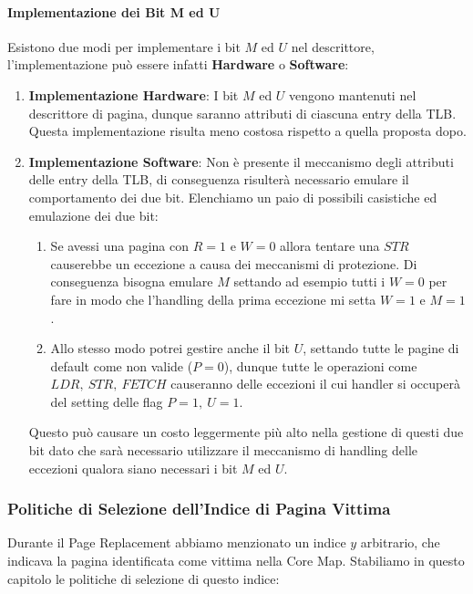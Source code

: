 \documentclass{article}
\begin{document}
\paragraph{Implementazione dei Bit M ed U} Esistono due modi per implementare i bit $M$ ed $U$ nel descrittore, l'implementazione può essere infatti \textbf{Hardware} o \textbf{Software}:

\begin{enumerate}
    \item \textbf{Implementazione Hardware}: I bit $M$ ed $U$ vengono mantenuti nel descrittore di pagina, dunque saranno attributi di ciascuna entry della TLB. Questa implementazione risulta meno costosa rispetto a quella proposta dopo.
    \item \textbf{Implementazione Software}: Non è presente il meccanismo degli attributi delle entry della TLB, di conseguenza risulterà necessario emulare il comportamento dei due bit.
    Elenchiamo un paio di possibili casistiche ed emulazione dei due bit:
    \begin{enumerate}
        \item Se avessi una pagina con $R=1$ e $W=0$ allora tentare una $STR$ causerebbe un eccezione a causa dei meccanismi di protezione. Di conseguenza bisogna emulare $M$ settando ad esempio tutti i $W=0$ per fare in modo che l'handling della prima eccezione mi setta $W=1$ e $M=1$.
        \item Allo stesso modo potrei gestire anche il bit $U$, settando tutte le pagine di default come non valide ($P=0$), dunque tutte le operazioni come $LDR, \: STR, \: FETCH$ causeranno delle eccezioni il cui handler si occuperà del setting delle flag $P=1, \: U=1$.
    \end{enumerate}
    Questo può causare un costo leggermente più alto nella gestione di questi due bit dato che sarà necessario utilizzare il meccanismo di handling delle eccezioni qualora siano necessari i bit $M$ ed $U$.
\end{enumerate}

\newpage

\subsubsection{Politiche di Selezione dell'Indice di Pagina Vittima}

Durante il Page Replacement abbiamo menzionato un indice $y$ arbitrario, che indicava la pagina identificata come vittima nella Core Map. Stabiliamo in questo capitolo le politiche di selezione di questo indice:
\end{document}
